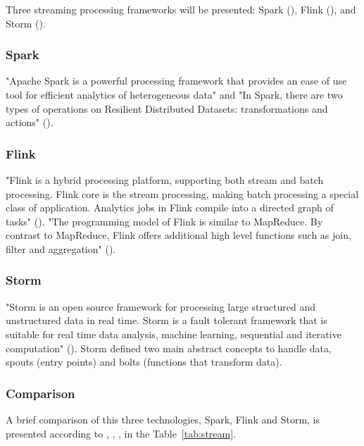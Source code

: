 Three streaming processing frameworks will be presented: Spark (\cite{spark}), Flink (\cite{flink}), and Storm (\cite{storm}).

\subsubsection{Spark}
\label{subsubsec:stateofart:tech:process:spark}

"Apache Spark  is a powerful processing framework that provides an ease of use tool for efficient analytics of heterogeneous data" and "In Spark, there are two types of operations on Resilient Distributed Datasets: transformations and actions" (\cite{inoubli2018comparative}).

\subsubsection{Flink}
\label{subsubsec:stateofart:tech:process:flink}

"Flink is a hybrid processing platform, supporting both stream and batch processing. Flink core is the stream processing, making batch processing a special class of application. Analytics jobs in Flink compile into a directed graph of tasks" (\cite{lopez2016performance}).
"The programming model of Flink is similar to MapReduce. By contrast to MapReduce, Flink offers additional high level functions such as join, filter and aggregation" (\cite{inoubli2018comparative}).

\subsubsection{Storm}
\label{subsubsec:stateofart:tech:process:storm}

"Storm is an open source framework for processing large structured and unstructured data in real time. Storm is a fault tolerant framework that is suitable for real time data analysis, machine learning, sequential and iterative computation" (\cite{inoubli2018comparative}).
Storm defined two main abstract concepts to handle data, spouts (entry points) and bolts (functions that transform data).

\subsubsection{Comparison}
\label{subsubsec:stateofart:tech:process:comp}

A brief comparison of this three technologies, Spark, Flink and Storm, is presented according to \cite{lopez2016performance}, \cite{wingerath2016real}, \cite{isah2019survey}, \cite{inoubli2018comparative} in the Table~\ref{tab:stream}.

